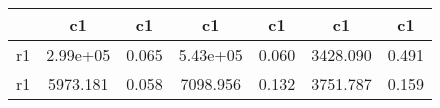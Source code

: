 \begin{table}[htbp]
\begin{tabular}{lcccccc} \hline \hline
 & c1  & c1  & c1  & c1  & c1  & c1  \\  \hline 
r1 &  2.99e+05 &     0.065 &  5.43e+05 &     0.060 &  3428.090 &     0.491 \\  
r1 &  5973.181 &     0.058 &  7098.956 &     0.132 &  3751.787 &     0.159 \\  
\hline \hline \end{tabular}
\end{table}
